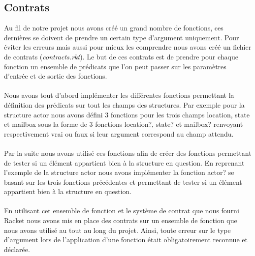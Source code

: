 \documentclass[a4paper,10pt]{article}
\begin{document}
\subsection{Contrats}
\label{contrats}
Au fil de notre projet nous avons créé un grand nombre de fonctions, ces dernières se doivent de prendre un certain type d'argument uniquement. Pour éviter les erreurs mais aussi pour mieux les comprendre nous avons créé un fichier de contrats (\textit{contracts.rkt}). Le but de ces contrats est de prendre pour chaque fonction un ensemble de prédicats que l’on peut passer sur
les paramètres d’entrée et de sortie des fonctions.\\
\\Nous avons tout d'abord implémenter les différentes fonctions permettant la définition des prédicats sur tout les champs des structures. Par exemple pour la structure actor nous avons défini 3 fonctions pour les trois champs location, state et mailbox sous la forme de 3 fonctions location?, state? et mailbox? renvoyant respectivement vrai ou faux si leur argument correspond au champ attendu.\\
\\Par la suite nous avons utilisé ces fonctions afin de créer des fonctions permettant de tester si un élément appartient bien à la structure en question.
En reprenant l'exemple de la structure actor nous avons implémenter la fonction actor? se basant sur les trois fonctions précédentes et permettant de tester si un élément appartient bien à la structure en question. \\
\\En utilisant cet ensemble de fonction et le système de contrat que nous fourni Racket nous avons mis en place des contrats sur un ensemble de fonction que nous avons utilisé au tout au long du projet. Ainsi, toute erreur sur le type d'argument lors de l'application d'une fonction était obligatoirement reconnue et déclarée.
\end{document}
